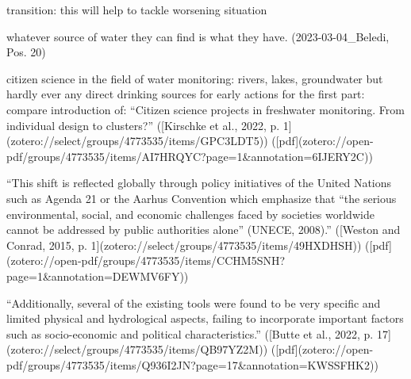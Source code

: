 


transition: this will help to tackle worsening situation

whatever source of water they can find is what they have. (2023-03-04_Beledi, Pos. 20)



citizen science in the field of water monitoring: rivers, lakes, groundwater but hardly ever any direct drinking sources for early actions
for the first part: compare introduction of: “Citizen science projects in freshwater monitoring. From individual design to clusters?” ([Kirschke et al., 2022, p. 1](zotero://select/groups/4773535/items/GPC3LDT5)) ([pdf](zotero://open-pdf/groups/4773535/items/AI7HRQYC?page=1&annotation=6IJERY2C))


“This shift is reflected globally through policy initiatives of the United Nations such as Agenda 21 or the Aarhus Convention which emphasize that “the serious environmental, social, and economic challenges faced by societies worldwide cannot be addressed by public authorities alone” (UNECE, 2008).” ([Weston and Conrad, 2015, p. 1](zotero://select/groups/4773535/items/49HXDHSH)) ([pdf](zotero://open-pdf/groups/4773535/items/CCHM5SNH?page=1&annotation=DEWMV6FY))

“Additionally, several of the existing tools were found to be very specific and limited physical and hydrological aspects, failing to incorporate important factors such as socio-economic and political characteristics.” ([Butte et al., 2022, p. 17](zotero://select/groups/4773535/items/QB97YZ2M)) ([pdf](zotero://open-pdf/groups/4773535/items/Q936I2JN?page=17&annotation=KWSSFHK2))

